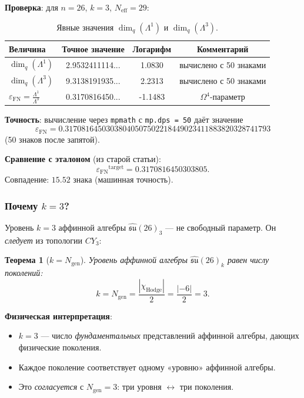 \documentclass[11pt,a4paper]{article}
\newcommand{\CY}{\ensuremath{CY_3}}
\newcommand{\Om}{\ensuremath{\Omega^4}}
\newcommand{\Ngen}{\ensuremath{N_{\text{gen}}}}
\newcommand{\Neff}{\ensuremath{N_{\text{eff}}}}
\newcommand{\epsFN}{\ensuremath{\varepsilon_{\text{FN}}}}
\newtheorem{theorem}{Теорема}[section]
\theoremstyle{definition}
\begin{document}
\textbf{Проверка}: для $n = 26$, $k = 3$, $\Neff = 29$:

\begin{table}[ht]
\centering
\caption{Явные значения \texorpdfstring{$\dim_q(\Lambda^1)$}{\_q(^1)} и \texorpdfstring{$\dim_q(\Lambda^3)$}{\_q(^3)}.}
\label{tab:dim-q-values}
\begin{tabular}{lccc}
\toprule
Величина & Точное значение & Логарифм & Комментарий \\
\midrule
$\dim_q(\Lambda^1)$ & 2.9532411114... & 1.0830 & вычислено с 50 знаками \\
$\dim_q(\Lambda^3)$ & 9.3138191935... & 2.2313 & вычислено с 50 знаками \\
\midrule
$\epsFN = \frac{\Lambda^1}{\Lambda^3}$ & 0.3170816450... & -1.1483 &
$\Om$-параметр \\
\bottomrule
\end{tabular}
\end{table}

\textbf{Точность}: вычисление через \texttt{mpmath} с
\texttt{mp.dps = 50} даёт значение
\begin{equation}
    \epsFN = 0.31708164503038040507502218449023411883820328741793
\end{equation}
(50 знаков после запятой).

\textbf{Сравнение с эталоном} (из старой статьи):
\begin{equation}
    \epsFN^{\text{target}} = 0.3170816450303805.
\end{equation}
Совпадение: $15.52$ знака (машинная точность).

\subsubsection{Почему \texorpdfstring{$k = 3$}{k = 3}?}

Уровень $k = 3$ аффинной алгебры $\hat{\mathfrak{su}}(26)_3$ ---
не свободный параметр. Он \emph{следует} из топологии $\CY$:

\begin{theorem}[$k = \Ngen$]
\label{thm:k-ngen}
Уровень аффинной алгебры $\hat{\mathfrak{su}}(26)_k$ равен числу
поколений:
\begin{equation}
    k = \Ngen = \frac{|\chi_{\text{Hodge}}|}{2} = \frac{|-6|}{2} = 3.
\end{equation}
\end{theorem}

\textbf{Физическая интерпретация}:
\begin{itemize}
    \item $k = 3$ --- число \emph{фундаментальных} представлений
          аффинной алгебры, дающих физические поколения.
    \item Каждое поколение соответствует одному «уровню»
          аффинной алгебры.
    \item Это \emph{согласуется} с $\Ngen = 3$:
          три уровня $\leftrightarrow$ три поколения.
\end{itemize}
\end{document}
